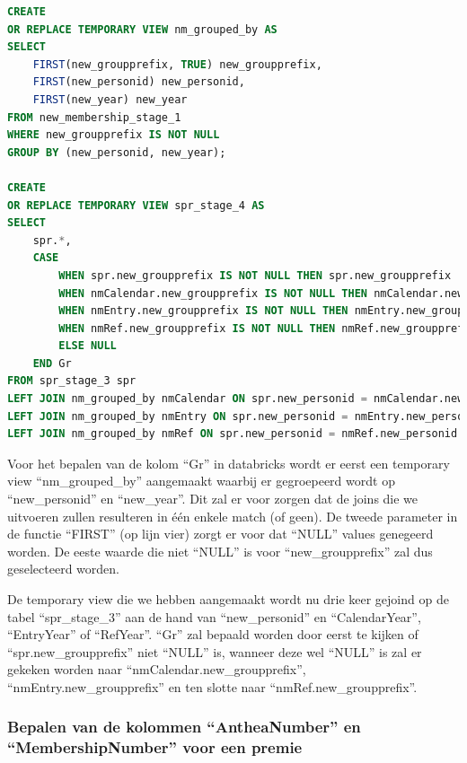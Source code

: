 \begin{lstlisting}[language=SQL, caption={Bepalen van de kolom ``Gr'' op ``new\_syndicalpremiumrequest''.}, style=myStyle]
CREATE
OR REPLACE TEMPORARY VIEW nm_grouped_by AS
SELECT 
    FIRST(new_groupprefix, TRUE) new_groupprefix, 
    FIRST(new_personid) new_personid, 
    FIRST(new_year) new_year 
FROM new_membership_stage_1
WHERE new_groupprefix IS NOT NULL 
GROUP BY (new_personid, new_year);

CREATE 
OR REPLACE TEMPORARY VIEW spr_stage_4 AS 
SELECT
    spr.*,
    CASE
        WHEN spr.new_groupprefix IS NOT NULL THEN spr.new_groupprefix
        WHEN nmCalendar.new_groupprefix IS NOT NULL THEN nmCalendar.new_groupprefix
        WHEN nmEntry.new_groupprefix IS NOT NULL THEN nmEntry.new_groupprefix
        WHEN nmRef.new_groupprefix IS NOT NULL THEN nmRef.new_groupprefix
        ELSE NULL
    END Gr
FROM spr_stage_3 spr
LEFT JOIN nm_grouped_by nmCalendar ON spr.new_personid = nmCalendar.new_personid AND spr.CalendarYear = nmCalendar.new_year
LEFT JOIN nm_grouped_by nmEntry ON spr.new_personid = nmEntry.new_personid AND spr.EntryYear = nmEntry.new_year
LEFT JOIN nm_grouped_by nmRef ON spr.new_personid = nmRef.new_personid AND spr.RefYear = nmRef.new_year;
\end{lstlisting}

Voor het bepalen van de kolom ``Gr'' in databricks wordt er eerst een temporary view ``nm\_grouped\_by'' aangemaakt waarbij er gegroepeerd wordt op ``new\_personid'' en ``new\_year''. Dit zal er voor zorgen dat de joins die we uitvoeren zullen resulteren in één enkele match (of geen). De tweede parameter in de functie ``FIRST'' (op lijn vier) zorgt er voor dat ``NULL'' values genegeerd worden. De eeste waarde die niet ``NULL'' is voor ``new\_groupprefix'' zal dus geselecteerd worden.

De temporary view die we hebben aangemaakt wordt nu drie keer gejoind op de tabel ``spr\_stage\_3'' aan de hand van ``new\_personid'' en ``CalendarYear'', ``EntryYear'' of ``RefYear''. ``Gr'' zal bepaald worden door eerst te kijken of ``spr.new\_groupprefix'' niet ``NULL'' is, wanneer deze wel ``NULL'' is zal er gekeken worden naar ``nmCalendar.new\_groupprefix'', ``nmEntry.new\_groupprefix'' en ten slotte naar ``nmRef.new\_groupprefix''.

\subsubsection{Bepalen van de kolommen ``AntheaNumber'' en ``MembershipNumber'' voor een premie}

